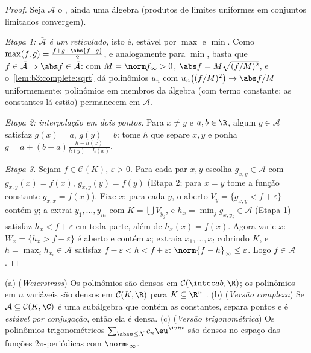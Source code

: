\begin{proof}
Seja $\bar{\mathcal A}$ o , ainda uma álgebra (produtos de limites uniformes em
conjuntos limitados convergem).

\emph{Etapa 1: $\bar{\mathcal A}$ é um reticulado}, isto é, estável por $\max$ e
$\min$. Como $\max(f,g) = \frac{f + g +
\abs{f-g}}2$, e analogamente para $\min$, basta que $f \in
\bar{\mathcal A} \Rightarrow \abs f \in \bar{\mathcal A}$:
com $M = \norm f_\infty > 0$, $\abs f = M\sqrt{(f/M)^2}$, e o~\cref{lem:b3:complete:sqrt} dá polinômios $u_n$ com $u_n\bigl((f/M)^2\bigr) \to \abs f/M$
uniformemente; polinômios em membros da álgebra (com termo constante:
as constantes lá estão) permanecem em $\bar{\mathcal A}$.

\emph{Etapa 2: interpolação em dois pontos.} Para $x \neq y$ e $a,
b \in \R$, algum
$g \in \mathcal A$ satisfaz $g(x) = a$, $g(y) = b$: tome $h$ que separe $x, y$ e ponha
$g = a + (b -
a)\frac{h - h(x)}{h(y) - h(x)}$.

\emph{Etapa 3.} Sejam $f \in \mathcal C(K)$, $\varepsilon > 0$. Para cada par $x, y$ escolha
$g_{x,y} \in \mathcal A$ com $g_{x,y}(x) = f(x)$, $g_{x,y}(y) = f(y)$ (Etapa 2; para $x = y$ tome a função constante
$g_{x,x} = f(x)$). Fixe $x$: para cada $y$, o aberto $V_y = \{g_{x,y} < f +
\varepsilon\}$ contém $y$; a
 extrai $y_1, \dots,
y_m$ com $K = \bigcup V_{y_j}$, e $h_x = \min_j g_{x, y_j}
\in \bar{\mathcal A}$ (Etapa 1) satisfaz $h_x < f +
\varepsilon$ em
toda parte, além de $h_x(x) = f(x)$. Agora varie $x$: $W_x =
\{h_x > f - \varepsilon\}$ é aberto e contém
$x$; extraia $x_1,
\dots, x_l$ cobrindo $K$, e $h = \max_i h_{x_i} \in
\bar{\mathcal A}$ satisfaz $f - \varepsilon < h < f +
\varepsilon$: $\norm{f - h}_\infty \leq \varepsilon$.
Logo $f \in \bar{\mathcal A}$.
\end{proof}

\begin{corollary}\label{cor:b3:complete:weierstrass}
(a) (\emph{Weierstrass}) Os polinômios são densos em $\mathcal
C(\intcc ab, \R)$; os
polinômios em $n$ variáveis são densos em $\mathcal C(K, \R)$ para $K \subseteq \R^n$ .
(b) (\emph{Versão complexa}) Se $\mathcal A \subseteq \mathcal
C(K, \C)$ é uma subálgebra que contém as
constantes, separa pontos e é \emph{estável por conjugação}, então ela
é densa.
(c) (\emph{Versão trigonométrica}) Os polinômios trigonométricos $\sum_{\abs n \leq N}c_n\eu^{\iu n t}$
são densos no espaço das funções  $2\pi$-periódicas com
$\norm\cdot_\infty$.
\end{corollary}

